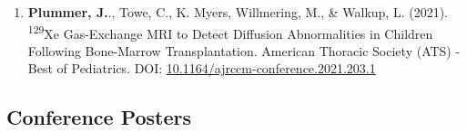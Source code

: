 \documentclass[12pt,]{scrartcl}
\begin{document}
\begin{enumerate}
  \item \textbf{Plummer, J.}., Towe, C., K. Myers, Willmering, M., \& Walkup, L. (2021). \textsuperscript{129}Xe Gas-Exchange MRI to Detect Diffusion Abnormalities in Children Following Bone-Marrow Transplantation. American Thoracic Society (ATS) - Best of Pediatrics. DOI: \href{http://dx.doi.org/10.1164/ajrccm-conference.2021.203.1_MeetingAbstracts.A1166}{10.1164/ajrccm-conference.2021.203.1}
  
  
\end{enumerate}



\subsection{Conference Posters}\label{conferences}
\end{document}
